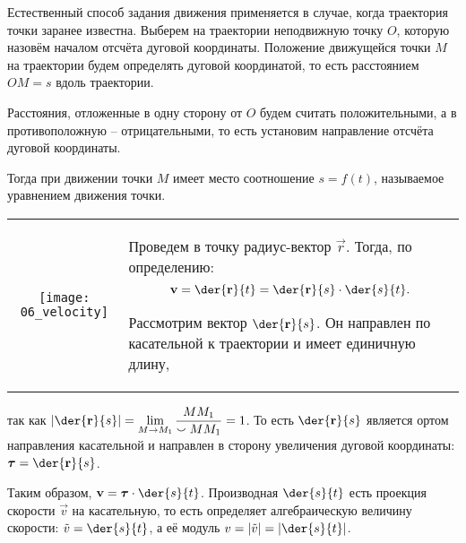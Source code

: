 
Естественный способ задания движения применяется в случае, когда траектория
точки заранее известна. Выберем на траектории неподвижную точку \( O \), которую
назовём началом отсчёта дуговой координаты. Положение движущейся точки \( M \)
на траектории будем определять дуговой координатой, то есть расстоянием
\( OM = s \) вдоль траектории.

Расстояния, отложенные в одну сторону от \( O \) будем считать положительными, а
в противоположную -- отрицательными, то есть установим направление отсчёта
дуговой координаты.

Тогда при движении точки \( M \) имеет место соотношение \( s = f(t) \),
называемое уравнением движения точки.


\begin{table}[h!]
    \begin{tabular}{C{.37}m{.55\textwidth}}
        \texttt{[image: 06\_velocity]} &
        Проведем в точку радиус-вектор \( \vec{r} \). Тогда, по определению:
        \[
            \vec{v} = \der{\vec{r}}{t} = \der{\vec{r}}{s}\cdot\der{s}{t}.
        \]

        Рассмотрим вектор \( \ds \der{\vec{r}}{s} \). Он направлен по
        касательной к траектории и имеет единичную длину,
    \end{tabular}
\end{table}

так как \( \ds \left|\der{\vec{r}}{s}\right| = \lim_{M\to M_1}\frac{MM_1}
{\smallsmile MM_1} = 1 \). То есть \( \ds\der{\vec{r}}{s} \) является ортом
направления касательной и направлен в сторону увеличения дуговой координаты:
\( \ds \vec{\tau} = \der{\vec{r}}{s} \).

Таким образом, \( \ds \vec{v} = \vec{\tau}\cdot\der{s}{t} \). Производная
\( \ds \der{s}{t} \) есть проекция скорости \( \vec{v} \) на касательную, то
есть определяет алгебраическую величину скорости: \( \ds \tilde{v} =
\der{s}{t} \), а её модуль \( \ds v = |\tilde{v}| = \left|\der{s}{t}\right| \).

